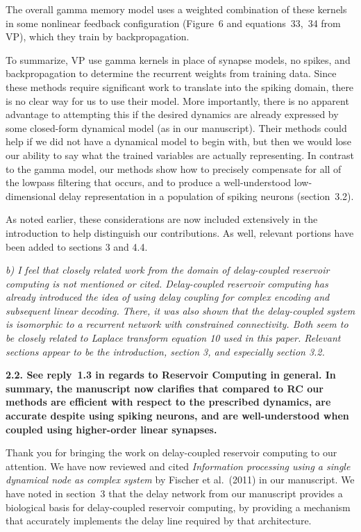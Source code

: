 \documentclass[a4paper]{article}
\newcommand{\newl}{\par\null\par}
\newcommand{\REVIEW}[1]{{\it #1}}
\newcommand{\REPLY}[1]{\newl\begin{adjustwidth}{2em}{2em}{\bf #1}\end{adjustwidth}\newl}
\begin{document}
{The overall gamma memory model uses a weighted combination of these kernels in some nonlinear feedback configuration (Figure~6 and equations~33,~34 from VP), which they train by backpropagation.
\newl
To summarize, VP use gamma kernels in place of synapse models, no spikes, and backpropagation to determine the recurrent weights from training data.
Since these methods require significant work to translate into the spiking domain, there is no clear way for us to use their model.
More importantly, there is no apparent advantage to attempting this if the desired dynamics are already expressed by some closed-form dynamical model (as in our manuscript).
Their methods could help if we did not have a dynamical model to begin with, but then we would lose our ability to say what the trained variables are actually representing.
In contrast to the gamma model, our methods show how to precisely compensate for all of the lowpass filtering that occurs, and to produce a well-understood low-dimensional delay representation in a population of spiking neurons (section~3.2).
\newl
As noted earlier, these considerations are now included extensively in the introduction to help distinguish our contributions.
As well, relevant portions have been added to sections 3 and 4.4.}

\REVIEW{b)      I feel that closely related work from the domain of delay-coupled reservoir computing is not mentioned or cited. Delay-coupled reservoir computing has already introduced the idea of using delay coupling for complex encoding and subsequent linear decoding. There, it was also shown that the delay-coupled system is isomorphic to a recurrent network with constrained connectivity. Both seem to be closely related to Laplace transform equation 10 used in this paper. Relevant sections appear to be the introduction, section 3, and especially section 3.2.}

\REPLY{2.2. See reply~1.3 in regards to Reservoir Computing in general.
In summary, the manuscript now clarifies that compared to RC our methods are efficient with respect to the prescribed dynamics, are accurate despite using spiking neurons, and are well-understood when coupled using higher-order linear synapses.
\newl
Thank you for bringing the work on delay-coupled reservoir computing to our attention.
We have now reviewed and cited \textit{Information processing using a single dynamical node as complex system} by Fischer et al.~(2011) in our manuscript.
We have noted in section~3 that the delay network from our manuscript provides a biological basis for delay-coupled reservoir computing, by providing a mechanism that accurately implements the delay line required by that architecture.}
\end{document}
